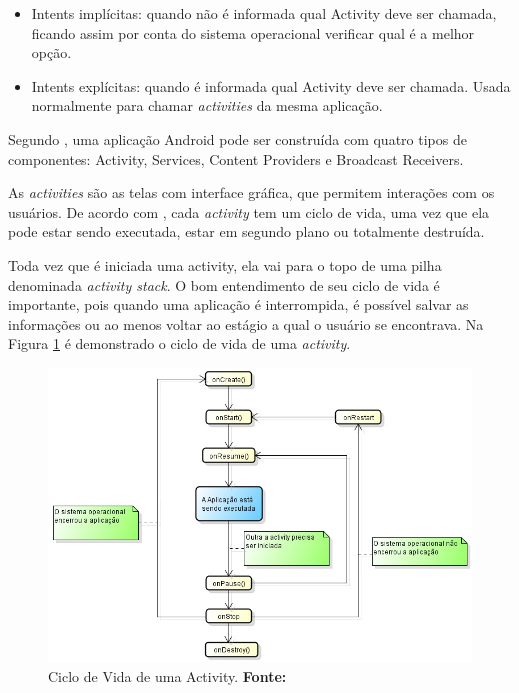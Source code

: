 	\begin{itemize}
	  
	  \item Intents implícitas: quando não é informada qual Activity deve ser
	  chamada, ficando assim por conta do sistema operacional verificar qual é a
	  melhor opção.
	  
	  \item Intents explícitas: quando é informada qual Activity deve ser chamada.
	  Usada normalmente para chamar \textit{activities} da mesma aplicação.
	  
	\end{itemize}
	
	\par Segundo , uma aplicação Android pode ser construída
com quatro tipos de componentes: Activity, Services, Content Providers e
Broadcast Receivers.

	\par As \textit{activities} são as telas com interface gráfica, que permitem
interações com os usuários. De acordo com , cada
\textit{activity} tem um ciclo de vida, uma vez que ela pode estar sendo
executada, estar em segundo plano ou totalmente destruída.

	\par Toda vez que é iniciada uma activity, ela vai para o topo de uma pilha
denominada \textit{activity stack}. O bom entendimento de seu ciclo de vida é
importante, pois quando uma aplicação é interrompida, é possível salvar as
informações ou ao menos voltar ao estágio a qual o usuário se encontrava. Na
Figura \ref{fig:qt1} é demonstrado o ciclo de vida de uma \textit{activity}.

	\begin{figure}[h!]
		\centerline{\includegraphics[scale=0.8]{./imagens/1_q_teorico/qt1.png}}
		\caption[Ciclo de Vida de uma Activity]{Ciclo de Vida de uma
		Activity.
		 \textbf{Fonte:}}
		\label{fig:qt1}
	\end{figure}

